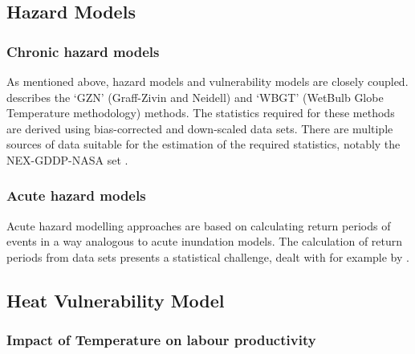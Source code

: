 \documentclass[a4paper,11pt]{extarticle} %
\begin{document}
\subsection{Hazard Models}

\subsubsection{Chronic hazard models}
As mentioned above, hazard models and vulnerability models are closely coupled. \cite{ZhangAndShindell:2021} describes the `GZN' (Graff-Zivin and Neidell) and `WBGT' (WetBulb Globe Temperature methodology) methods. The statistics required for these methods are derived using bias-corrected and down-scaled data sets. There are multiple sources of data suitable for the estimation of the required statistics, notably the NEX-GDDP-NASA set \cite{ThrasherEtAl:2022}.



\subsubsection{Acute hazard models}
Acute hazard modelling approaches are based on calculating return periods of events in a way analogous to acute inundation models. The calculation of return periods from data sets presents a statistical challenge, dealt with for example by \cite{MentaschiEtAl:2016}.





\subsection{Heat Vulnerability Model}

\label{SubSec:HeatVulnerabilityModel}

\subsubsection{Impact of Temperature on labour productivity}
\end{document}
